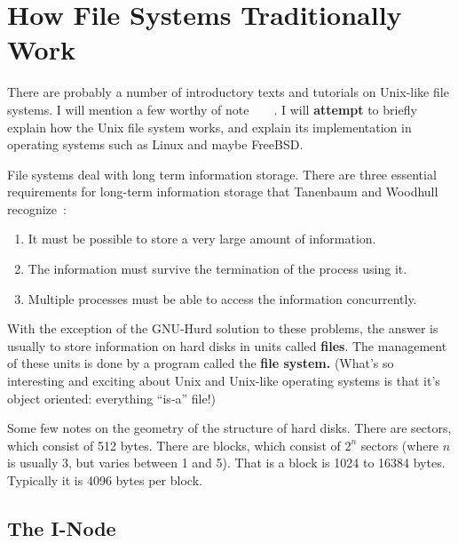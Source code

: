 \documentclass{article}
\begin{document}
\section{How File Systems Traditionally Work}

There are probably a number of introductory texts and tutorials on Unix-like file systems. I will mention a few worthy of note~\cite{skelix}~\cite{minixbook}~\cite{bsdbook}~\cite{linuxbook}. I will \textbf{attempt} to briefly explain how the Unix file system works, and explain its implementation in operating systems such as Linux and maybe FreeBSD.

File systems deal with long term information storage. There are three essential requirements for long-term information storage that Tanenbaum and Woodhull recognize~\cite{minixbook}:
\begin{enumerate}
 \item It must be possible to store a very large amount of information.
 \item The information must survive the termination of the process using it.
 \item Multiple processes must be able to access the information concurrently.
\end{enumerate}
With the exception of the GNU-Hurd solution to these problems, the answer is usually to store information on hard disks in units called \textbf{files}. The management of these units is done by a program called the \textbf{file system.} (What's so interesting and exciting about Unix and Unix-like operating systems is that it's object oriented: everything ``is-a'' file!)

Some few notes on the geometry of the structure of hard disks. There are sectors, which consist of 512 bytes. There are blocks, which consist of $2^{n}$ sectors (where $n$ is usually 3, but varies between 1 and 5). That is a block is 1024 to 16384 bytes. Typically it is 4096 bytes per block.

\subsection{The I-Node}
\end{document}

